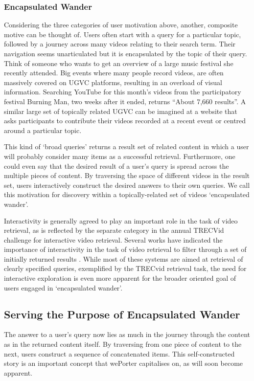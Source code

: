 \subsubsection{Encapsulated Wander}
Considering the three categories of user motivation above, another, composite motive can be thought of. Users often start with a query for a particular topic, followed by a journey across many videos relating to their search term. Their navigation seems unarticulated but it is encapsulated by the topic of their query. Think of someone who wants to get an overview of a large music festival she recently attended. Big events where many people record videos, are often massively covered on UGVC platforms, resulting in an overload of visual information. Searching YouTube for this month's videos from the participatory festival Burning Man, two weeks after it ended, returns ``About 7,660 results''\cite{youtubeBM}. A similar large set of topically related UGVC can be imagined at a website that asks participants to contribute their videos recorded at a recent event or centred around a particular topic.

This kind of `broad queries' returns a result set of related content in which a user will probably consider many items as a successful retrieval. Furthermore, one could even say that the desired result of a user's query is spread across the multiple pieces of content. By traversing the space of different videos in the result set, users interactively construct the desired answers to their own queries. We call this motivation for discovery within a topically-related set of videos `encapsulated wander'.

Interactivity is generally agreed to play an important role in the task of video retrieval, as is reflected by the separate category in the annual TRECVid challenge for interactive video retrieval\cite{Smeaton:2006ww}. Several works have indicated the importance of interactivity in the task of video retrieval to filter through a set of initially returned results \cite{DeRooij:2007ua, Christel:2004wm, DeRooij:2007ua, DeRooij:2008ut}. While most of these systems are aimed at retrieval of clearly specified queries, exemplified by the TRECvid retrieval task, the need for interactive exploration is even more apparent for the broader oriented goal of users engaged in `encapsulated wander'.

\subsection{Serving the Purpose of Encapsulated Wander}
The answer to a user's query now lies as much in the journey through the content as in the returned content itself. By traversing from one piece of content to the next, users construct a sequence of concatenated items. This self-constructed story is an important concept that wePorter capitalises on, as will soon become apparent.

